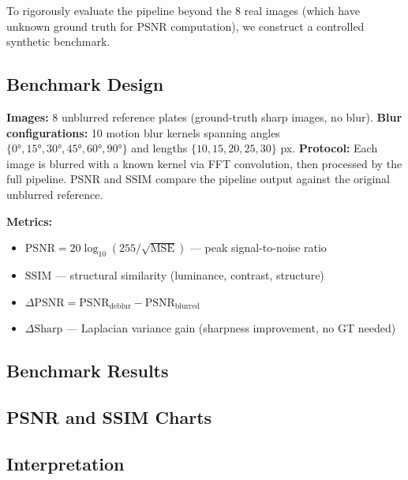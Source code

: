 \documentclass[12pt,a4paper]{article}
\begin{document}
To rigorously evaluate the pipeline beyond the 8 real images (which have unknown ground
truth for PSNR computation), we construct a controlled synthetic benchmark.

\subsection{Benchmark Design}

\textbf{Images:} 8 unblurred reference plates (ground-truth sharp images, no blur).
\textbf{Blur configurations:} 10 motion blur kernels spanning angles
$\{0°, 15°, 30°, 45°, 60°, 90°\}$ and lengths $\{10, 15, 20, 25, 30\}$ px.
\textbf{Protocol:} Each image is blurred with a known kernel via FFT convolution,
then processed by the full pipeline. PSNR and SSIM compare the pipeline output
against the original unblurred reference.

\textbf{Metrics:}
\begin{itemize}[noitemsep, topsep=2pt]
  \item $\mathrm{PSNR} = 20\log_{10}(255 / \sqrt{\mathrm{MSE}})$ --- peak signal-to-noise ratio
  \item $\mathrm{SSIM}$ --- structural similarity (luminance, contrast, structure)
  \item $\Delta\mathrm{PSNR} = \mathrm{PSNR}_{\mathrm{deblur}} - \mathrm{PSNR}_{\mathrm{blurred}}$
  \item $\Delta\mathrm{Sharp}$ --- Laplacian variance gain (sharpness improvement, no GT needed)
\end{itemize}

\subsection{Benchmark Results}


\subsection{PSNR and SSIM Charts}



\subsection{Interpretation}
\end{document}
